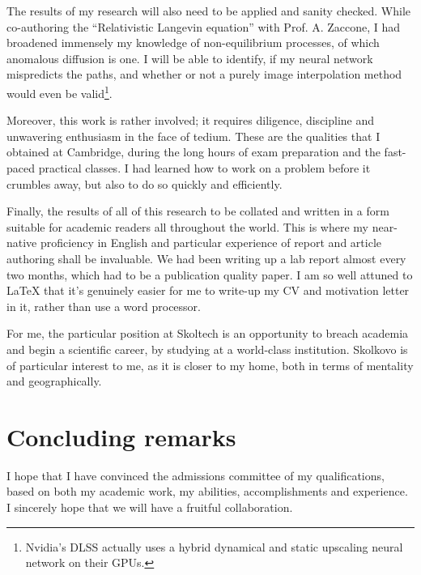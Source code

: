 \documentclass[a4paper, twocolumn]{article}
\begin{document}
The results of my research will also need to be applied and sanity
checked. While co-authoring the ``Relativistic Langevin equation''
with Prof. A. Zaccone, I had broadened immensely my knowledge of
non-equilibrium processes, of which anomalous diffusion is one. I
will be able to identify, if my neural network mispredicts the
paths, and whether or not a purely image interpolation method would
even be valid\footnote{Nvidia's DLSS actually uses a hybrid dynamical and
static upscaling neural network on their GPUs.}. 

Moreover, this work is rather involved; it requires diligence,
discipline and unwavering enthusiasm in the face of tedium. These
are the qualities that I obtained at Cambridge, during the long
hours of exam preparation and the fast-paced practical classes. I
had learned how to work on a problem before it crumbles away, but
also to do so quickly and efficiently.

Finally, the results of all of this research to be collated and
written in a form suitable for academic readers all throughout the
world. This is where my near-native proficiency in English and
particular experience of report and article authoring shall be
invaluable. We had been writing up a lab report almost every two
months, which had to be a publication quality paper. I am so well
attuned to \LaTeX{} that it's genuinely easier for me to write-up my CV
and motivation letter in it, rather than use a word processor.

For me, the particular position at Skoltech is an opportunity to
breach academia and begin a scientific career, by studying at a
world-class institution. Skolkovo is of particular interest to me,
as it is closer to my home, both in terms of mentality and
geographically. 



\section{Concluding remarks}
\label{sec:org575b53b}

I hope that I have convinced the admissions committee of my
qualifications, based on both my academic work, my abilities,
accomplishments and experience. I sincerely hope that we will have a
fruitful collaboration. 
\end{document}
